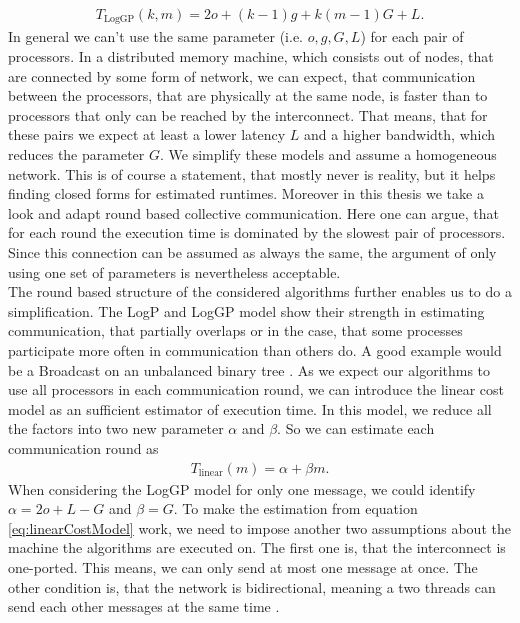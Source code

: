 \begin{align*}
	T_\textrm{LogGP}(k,m) = 2 o + (k-1)g  + k(m-1)G + L .
\end{align*}
In general  we can't use the same parameter (i.e. $o, g, G, L$) for each pair of processors. In a distributed memory machine, which consists out of nodes, that are connected by some form of network, we can expect, that communication between the processors, that are physically at the same node, is faster than to processors that only can be reached by the interconnect. That means, that for these pairs we expect at least a lower latency $L$ and a higher bandwidth, which reduces the parameter $G$.
We simplify these models and assume a homogeneous network. This is of course a statement, that mostly never is reality, but it helps finding closed forms for estimated runtimes. Moreover in this thesis we take a look and adapt round based collective communication. Here one can argue, that for each round the execution time is dominated by the slowest pair of processors. Since this connection can be assumed as always the same, the argument of only using one set of parameters is nevertheless acceptable. \\
The round based structure of the considered algorithms further enables us to do a simplification. The LogP and LogGP model show their strength in estimating communication, that partially overlaps or in the case, that some processes participate more often in communication than others do. A good example would be a Broadcast on an unbalanced binary tree \cite{LogP}. As we expect our algorithms to use all processors in each communication round, we can introduce the linear cost model as an sufficient estimator of execution time. In this model, we reduce all the factors into two new parameter $\alpha$ and $\beta$. So we can estimate each communication round as
\begin{align}
	T_\mathrm{linear}(m) = \alpha + \beta m. \label{eq:linearCostModel}
\end{align}
When considering the LogGP model for only one message, we could identify $\alpha=2o + L - G$ and $\beta = G$. To make the estimation from equation \ref{eq:linearCostModel} work, we need to impose another two assumptions about the machine the algorithms are executed on. The first one is, that the interconnect is one-ported. This means, we can only send at most one message at once. The other condition is, that the network is bidirectional, meaning a two threads can send each other messages at the same time \cite{BroadcastWorkOpt}.\\
